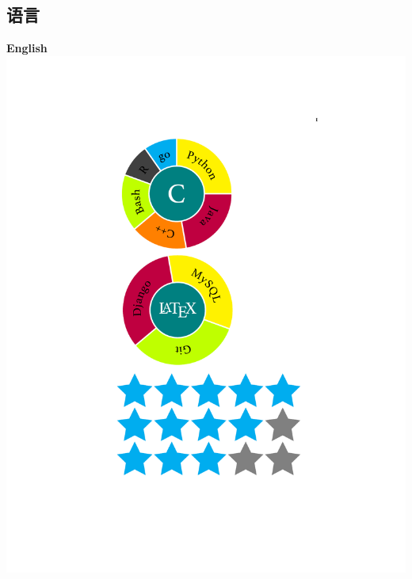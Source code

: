 \documentclass[]{friggeri-cv}
\begin{document}
\begin{aside}
  \section{\cuti 语言}
    \textbf{English}\includegraphics[scale=0.16]{img/5stars}

\end{aside}
\end{document}
